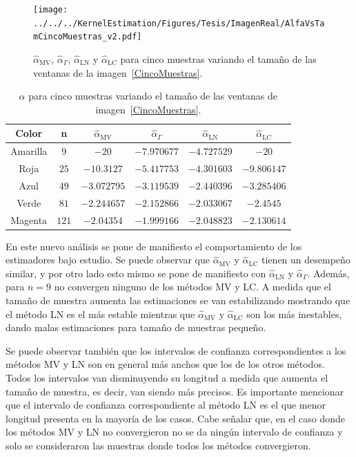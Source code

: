 \begin{figure}[htb]
	\centering
	\texttt{[image: ../../../KernelEstimation/Figures/Tesis/ImagenReal/AlfaVsTamCincoMuestras\_v2.pdf]}
	\caption{\label{AlfaVsTamCincoMuestras}\small $\widehat{\alpha}_{\text{MV}}$, $\widehat{\alpha}_{\Gamma}$, $\widehat{\alpha}_{\text{LN}}$ y  $\widehat{\alpha}_{\text{LC}}$ para cinco muestras variando el tamaño de las ventanas de la imagen~\ref{CincoMuestras}.}
\end{figure}

\begin{table}[H]
	\centering
	\caption{\label{TablaCincoMuestras}$\widehat{\alpha}$ para cinco muestras variando el tamaño de las ventanas de imagen~\ref{CincoMuestras}.}
	\begin{tabular}{c*5{c}}
		\toprule
		Color       &  n    &  $\widehat{\alpha}_{\text{MV}}$    &  $\widehat{\alpha}_{\Gamma}$  &  $\widehat{\alpha}_{\text{LN}}$ &  $\widehat{\alpha}_{\text{LC}}$\\
		\midrule
		Amarilla    & $9$     & $-20$       & $-7.970677$ & $-4.727529$ & $-20$\\
		Roja        & $25$    & $-10.3127$  & $-5.417753$ & $-4.301603$ & $-9.806147$\\
		Azul        & $49$    & $-3.072795$ & $-3.119539$ & $-2.440396$ & $-3.285406$\\
		Verde       & $81$    & $-2.244657$ & $-2.152866$ & $-2.033067$ & $-2.4545$\\
		Magenta     & $121$   & $-2.04354$  & $-1.999166$ & $-2.048823$ & $-2.130614$\\
		\bottomrule
	\end{tabular}
\end{table}

En este nuevo análisis se pone de manifiesto el comportamiento de los estimadores bajo estudio. Se puede observar que $\widehat{\alpha}_{\text{MV}}$ y $\widehat{\alpha}_{\text{LC}}$ tienen un desempeño similar, y por otro lado esto mismo se pone de manifiesto con $\widehat{\alpha}_{\text{LN}}$ y $\widehat{\alpha}_{\Gamma}$. Además, para $n=9$ no convergen ninguno de los métodos MV y LC. A medida que el tamaño de muestra aumenta las estimaciones se van estabilizando mostrando que el método LN es el más estable mientras que $\widehat{\alpha}_{\text{MV}}$ y $\widehat{\alpha}_{\text{LC}}$ son los más inestables, dando malas estimaciones para tamaño de muestras pequeño. 

Se puede observar también que los intervalos de confianza correspondientes a los métodos MV y LN son en general más anchos que los de los otros métodos. Todos los intervalos van disminuyendo su longitud a medida que aumenta el tamaño de muestra, es decir, van siendo más precisos. Es importante mencionar que el intervalo de confianza correspondiente al método LN es el que menor longitud presenta en la mayoría de los casos. Cabe señalar que, en el caso donde los métodos MV y LN no convergieron no se da ningún intervalo de confianza y solo se consideraron las muestras donde todos los métodos convergieron.

